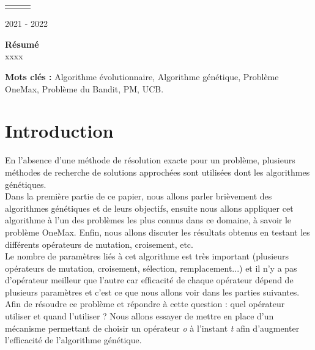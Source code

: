 \documentclass[12pt]{article}
\begin{document}
\begin{table}[H]
\begin{tabular}{lll}
&&\\
\end{tabular}
\end{table}

\begin{center}
2021 - 2022
\end{center}


\newpage
\renewcommand\headrulewidth{1 pt}\fancyhead[L]{}\fancyhead[C]{} 
\thispagestyle{empty}
\tableofcontents

\newpage
\renewcommand\headrulewidth{1 pt}\fancyhead[L]{}\fancyhead[C]{}

\thispagestyle{empty}
\textbf{Résumé}\\

xxxx

\textbf{Mots clés : } Algorithme évolutionnaire, Algorithme génétique, Problème OneMax, Problème du Bandit, PM, UCB.

\newpage
\renewcommand\headrulewidth{1 pt}\fancyhead[L]{}\fancyhead[C]{} 
\setcounter{page}{1}

\section{Introduction}
En l'absence d'une méthode de résolution exacte pour un problème, plusieurs méthodes de recherche de solutions approchées sont utilisées dont les algorithmes génétiques.\\
 
Dans la première partie de ce papier, nous allons parler brièvement des algorithmes génétiques et de leurs objectifs, ensuite nous allons appliquer cet algorithme à l'un des problèmes les plus connus dans ce domaine, à savoir le problème OneMax. Enfin, nous allons discuter les résultats obtenus en testant les différents opérateurs de mutation, croisement, etc.\\

Le nombre de paramètres liés à cet algorithme est très important (plusieurs opérateurs de mutation, croisement, sélection, remplacement...) et il n'y a pas d'opérateur meilleur que l'autre car efficacité de chaque opérateur dépend de plusieurs paramètres et c'est ce que nous allons voir dans les parties suivantes. Afin de résoudre ce problème et répondre à cette question : quel opérateur utiliser et quand l'utiliser ? Nous allons essayer de mettre en place d'un mécanisme permettant de choisir un opérateur \textit{o} à l'instant \textit{t} afin d'augmenter l'efficacité de l'algorithme génétique.\\
\end{document}
